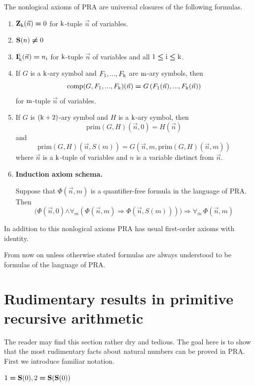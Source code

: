 \documentclass[10pt]{amsart}
\newcommand{\mforall}{\boldsymbol{\forall}}
\newcommand{\mra}{\boldsymbol{\Rightarrow}}
\newcommand{\mand}{\boldsymbol{\wedge}}
\newcommand{\mleq}{\boldsymbol{\leq}}
\newcommand{\meq}{\boldsymbol{=}}
\newcommand{\mneq}{\boldsymbol{\neq}}
\begin{document}
The nonlogical axioms of $\mathrm{PRA}$ are universal closures of the following formulas.
\begin{enumerate}[label=\textbf{\arabic*.}, leftmargin=3.0em]
	\item $\bd{Z}_{\rm{k}}(\vec{n}) \meq 0$ for $\rm{k}$-tuple $\vec{n}$ of variables.
	\item $\bd{S}(n) \mneq 0$
	\item $\bd{I}^{\rm{i}}_{\rm{k}}(\vec{n}) \meq n_{\rm{i}}$ for $\rm{k}$-tuple $\vec{n}$ of variables and all $\rm{1} \mleq \rm{i} \mleq \rm{k}$.
	\item If $G$ is a $\rm{k}$-ary symbol and $F_{\rm{1}},...,F_{\rm{k}}$ are $\rm{m}$-ary symbols, then
	      $$\mathrm{comp}(G,F_{\rm{1}},...,F_{\rm{k}})(\vec{n}) \meq G\left(F_{\rm{1}}(\vec{n}),...,F_{\rm{k}}(\vec{n})\right)$$
	      for $\rm{m}$-tuple $\vec{n}$ of variables.
	\item If $G$ is $\rm{(k+2)}$-ary symbol and $H$ is a $\rm{k}$-ary symbol, then
	      $$\mathrm{prim}(G,H)(\vec{n},0) \meq H(\vec{n})$$
	      and
	      $$\mathrm{prim}(G,H)\left(\vec{n},S(m)\right) \meq G\left(\vec{n},m,\mathrm{prim}(G,H)(\vec{n},m)\right)$$
	      where $\vec{n}$ is a $\rm{k}$-tuple of variables and $n$ is a variable distinct from $\vec{n}$.
	\item \textbf{Induction axiom schema.}

	      Suppose that $\Phi(\vec{n},m)$ is a quantifier-free formula in the language of $\mathrm{PRA}$. Then
	      $$\big(\Phi(\vec{n},0) \mand \mforall_m\left(\Phi(\vec{n},m) \mra \Phi(\vec{n},S(m))\right)\big) \mra \mforall_m\,\Phi(\vec{n},m)$$
\end{enumerate}
\noindent
In addition to this nonlogical axioms $\mathrm{PRA}$ has usual first-order axioms with identity.

From now on unless otherwise stated formulas are always understood to be formulas of the language of $\mathrm{PRA}$.

\section{Rudimentary results in primitive recursive arithmetic}
\noindent
The reader may find this section rather dry and tedious. The goal here is to show that the most rudimentary facts about natural numbers can be proved in $\mathrm{PRA}$. First we introduce familiar notation.

\begin{definition}
	$1 \meq \bd{S}(0),2 \meq \bd{S}(\bd{S}(0))$
\end{definition}
\end{document}
